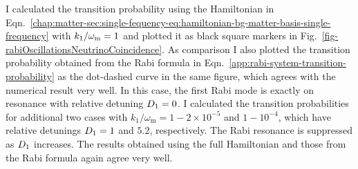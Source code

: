 

I calculated the transition probability using the Hamiltonian in Eqn.~\ref{chap:matter-sec:single-fequency-eq:hamiltonian-bg-matter-basis-single-frequency} with $k_1/\omega_\mathrm m=1$ and plotted it as black square markers in Fig.~\ref{fig-rabiOscillationsNeutrinoCoincidence}. As comparison I also plotted the transition probability obtained from the Rabi formula in Eqn.~\ref{app:rabi-system-transition-probability} as the dot-dashed curve in the same figure, which agrees with the numerical result very well. In this case, the first Rabi mode is exactly on resonance with relative detuning $D_1=0$. I calculated the transition probabilities for additional two cases with $k_1/\omega_\mathrm{m}=1-2\times 10^{-5}$ and $1-10^{-4}$, which have relative detunings $D_1 = 1$ and $5.2$, respectively. The Rabi resonance is suppressed as $D_1$ increases. The results obtained using the full Hamiltonian and those from the Rabi formula again agree very well. 

